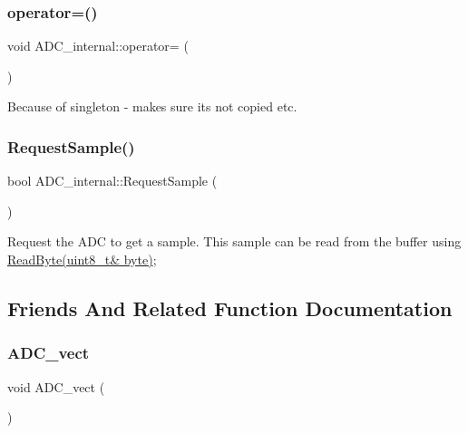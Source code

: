 \subsubsection{\texorpdfstring{operator=()}{operator=()}}
{\footnotesize\ttfamily void A\+D\+C\+\_\+internal\+::operator= (\begin{DoxyParamCaption}\item[{const \hyperlink{class_a_d_c__internal}{A\+D\+C\+\_\+internal} \&}]{ }\end{DoxyParamCaption})\hspace{0.3cm}{\ttfamily [delete]}}

Because of singleton -\/ makes sure its not copied etc. \hypertarget{class_a_d_c__internal_accd9d981273a75e739f16232196f0d5e}{}\label{class_a_d_c__internal_accd9d981273a75e739f16232196f0d5e} 
\subsubsection{\texorpdfstring{Request\+Sample()}{RequestSample()}}
{\footnotesize\ttfamily bool A\+D\+C\+\_\+internal\+::\+Request\+Sample (\begin{DoxyParamCaption}{ }\end{DoxyParamCaption})}

Request the A\+DC to get a sample. This sample can be read from the buffer using \hyperlink{class_stream_a6db4180f5834073f992608b856bddca2}{Read\+Byte(uint8\+\_\+t\& byte)}; 

\subsection{Friends And Related Function Documentation}
\hypertarget{class_a_d_c__internal_a7fd45f1c13cbbf59c3e1ce84deca2e01}{}\label{class_a_d_c__internal_a7fd45f1c13cbbf59c3e1ce84deca2e01} 
\subsubsection{\texorpdfstring{A\+D\+C\+\_\+vect}{ADC\_vect}}
{\footnotesize\ttfamily void A\+D\+C\+\_\+vect (\begin{DoxyParamCaption}{ }\end{DoxyParamCaption})\hspace{0.3cm}{\ttfamily [friend]}}

